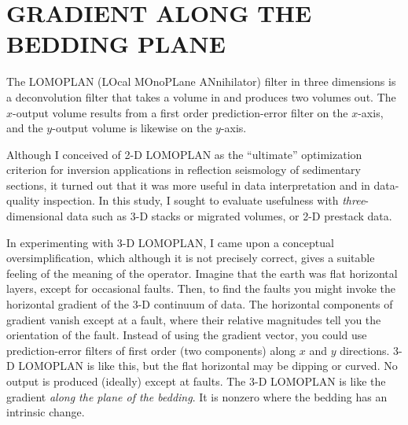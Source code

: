 
\section{GRADIENT ALONG THE BEDDING PLANE}
\par
The LOMOPLAN (LOcal MOnoPLane ANnihilator) filter
in three dimensions is a deconvolution filter that takes a volume in
and produces two volumes out.
The $x$-output volume results from a first order
prediction-error filter on the $x$-axis,
and the $y$-output volume is likewise on the $y$-axis.

\par
Although
I conceived of 2-D LOMOPLAN as the ``ultimate'' optimization criterion
for inversion applications in reflection seismology of sedimentary sections,
it turned out that it was more useful in data interpretation
and in data-quality inspection.
In this study, I sought to evaluate usefulness with
{\it three}-dimensional data
such as 3-D stacks or migrated volumes, or 2-D prestack data.

\par
In experimenting with 3-D LOMOPLAN,
I came upon a conceptual oversimplification,
which although it is not precisely correct,
gives a suitable feeling of the meaning of the operator.
Imagine that the earth was flat horizontal layers, except for occasional faults.
Then, to find the faults you might invoke the horizontal
gradient of the 3-D continuum of data.
The horizontal components of gradient vanish except at a fault,
where their relative magnitudes tell you the orientation of the fault.
Instead of using the gradient vector,
you could use prediction-error filters of first order (two components)
along $x$ and $y$ directions.
3-D LOMOPLAN is like this,
but the flat horizontal  may be dipping or curved.
No output is produced (ideally) except at faults.
The 3-D LOMOPLAN is like the gradient
{\it along the plane of the bedding}.
It is nonzero where the bedding has an intrinsic change.

\par\noindent
{}

